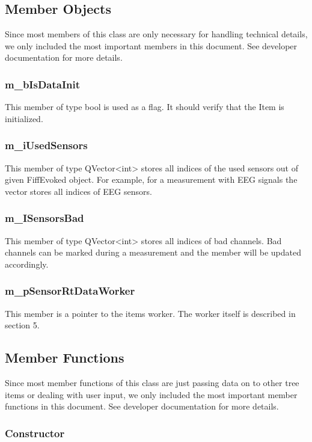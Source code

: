 \subsection{Member Objects}

Since most members of this class are only necessary for handling technical details, we only included the most important members in this document. See developer documentation for more details.

\subsubsection{m\_bIsDataInit}
This member of type bool is used as a flag. It should verify that the Item is initialized.

\subsubsection{m\_iUsedSensors}
This member of type QVector<int> stores all indices of the used sensors out of given FiffEvoked object. For example, for a measurement with EEG signals the vector stores all indices of EEG sensors.

\subsubsection{m\_ISensorsBad}
This member of type QVector<int> stores all indices of bad channels. Bad channels can be marked during a measurement and the member will be updated accordingly.

\subsubsection{m\_pSensorRtDataWorker}
This member is a pointer to the items worker. The worker itself is described in section 5.

\subsection{Member Functions}

Since most member functions of this class are just passing data on to other tree items or dealing with user input, we only included the most important member functions in this document. See developer documentation for more details.

\subsubsection{Constructor}

